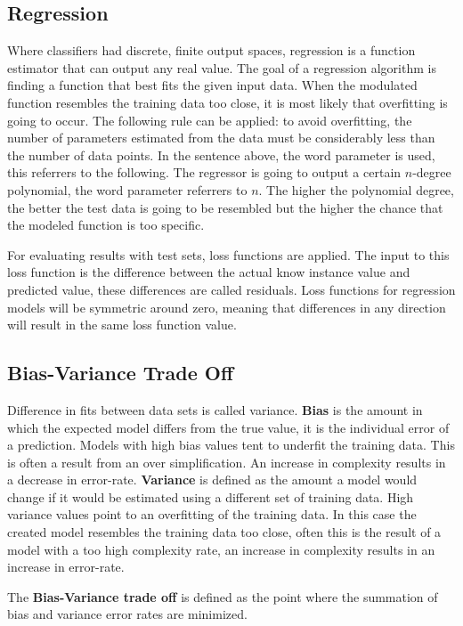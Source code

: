 \subsection{Regression}
Where classifiers had discrete, finite output spaces, regression is a function estimator that can output any real value.
The goal of a regression algorithm is finding a function that best fits the given input data. 
When the modulated function resembles the training data too close, it is most likely that overfitting is going to occur.
The following rule can be applied: to avoid overfitting, the number of parameters estimated from the data must be considerably less than the number of data points.
In the sentence above, the word parameter is used, this referrers to the following.
The regressor is going to output a certain $n$-degree polynomial, the word parameter referrers to $n$.
The higher the polynomial degree, the better the test data is going to be resembled but the higher the chance that the modeled function is too specific.
\par 
For evaluating results with test sets, loss functions are applied. 
The input to this loss function is the difference between the actual know instance value and predicted value, these differences are called residuals.
Loss functions for regression models will be symmetric around zero, meaning that differences in any direction will result in the same loss function value.

\subsection{Bias-Variance Trade Off}
Difference in fits between data sets is called variance.
\textbf{Bias} is the amount in which the expected model differs from the true value, it is the individual error of a prediction.
Models with high bias values tent to underfit the training data. 
This is often a result from an over simplification.
An increase in complexity results in a decrease in error-rate.
\textbf{Variance} is defined as the amount a model would change if it would be estimated using a different set of training data.
High variance values point to an overfitting of the training data. 
In this case the created model resembles the training data too close, often this is the result of a model with a too high complexity rate, an increase in complexity results in an increase in error-rate.
\par 
The \textbf{Bias-Variance trade off} is defined as the point where the summation of bias and variance error rates are minimized.

